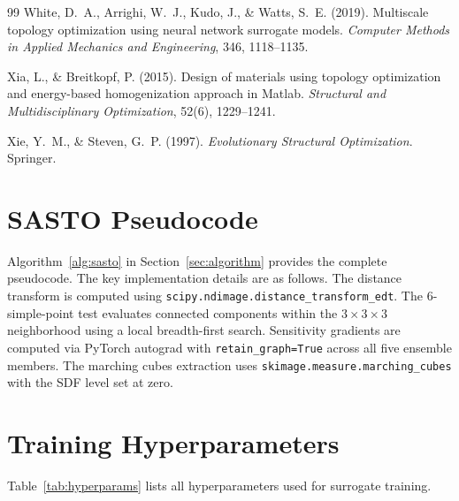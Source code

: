 \documentclass[11pt]{article}
\theoremstyle{plain}
\theoremstyle{definition}
\theoremstyle{remark}
\begin{document}
\begin{thebibliography}{99}
White, D.~A., Arrighi, W.~J., Kudo, J., \& Watts, S.~E. (2019). Multiscale topology optimization using neural network surrogate models. \emph{Computer Methods in Applied Mechanics and Engineering}, 346, 1118--1135.

Xia, L., \& Breitkopf, P. (2015). Design of materials using topology optimization and energy-based homogenization approach in Matlab. \emph{Structural and Multidisciplinary Optimization}, 52(6), 1229--1241.

Xie, Y.~M., \& Steven, G.~P. (1997). \emph{Evolutionary Structural Optimization}. Springer.

\end{thebibliography}


\appendix

\section{SASTO Pseudocode}
\label{app:pseudocode}

Algorithm~\ref{alg:sasto} in Section~\ref{sec:algorithm} provides the complete pseudocode. The key implementation details are as follows. The distance transform is computed using \texttt{scipy.ndimage.distance\_transform\_edt}. The 6-simple-point test evaluates connected components within the $3\times3\times3$ neighborhood using a local breadth-first search. Sensitivity gradients are computed via PyTorch autograd with \texttt{retain\_graph=True} across all five ensemble members. The marching cubes extraction uses \texttt{skimage.measure.marching\_cubes} with the SDF level set at zero.

\section{Training Hyperparameters}
\label{app:hyperparams}

Table~\ref{tab:hyperparams} lists all hyperparameters used for surrogate training.
\end{document}
